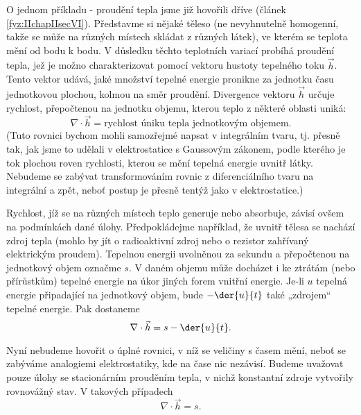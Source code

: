     O jednom příkladu - proudění tepla jsme již hovořili dříve (článek \ref{fyz:IIchapIIsecVI}).
    Představme si nějaké těleso (ne nevyhnutelně homogenní, takže se může na různých místech skládat
    z různých látek), ve kterém se teplota mění od bodu k bodu. V důsledku těchto teplotních variací
    probíhá proudění tepla, jež je možno charakterizovat pomocí vektoru hustoty tepelného toku
    \(\vec{h}\). Tento vektor udává, jaké množství tepelné energie pronikne za jednotku času
    jednotkovou plochou, kolmou na směr proudění. Divergence vektoru \(\vec{h}\) určuje rychlost,
    přepočtenou na jednotku objemu, kterou teplo z některé oblasti uniká:
    \begin{equation*}
      \nabla\cdot\vec{h} = \text{rychlost úniku tepla jednotkovým objemem.}
    \end{equation*}
    (Tuto rovnici bychom mohli samozřejmé napsat v integrálním tvaru, tj. přesně tak, jak jsme to
    udělali v elektrostatice s Gaussovým zákonem, podle kterého je tok plochou roven rychlosti,
    kterou se mění tepelná energie uvnitř látky. Nebudeme se zabývat transformováním rovnic z
    diferenciálního tvaru na integrální a zpět, neboť postup je přesně tentýž jako v
    elektrostatice.)

    Rychlost, jíž se na různých místech teplo generuje nebo absorbuje, závisí ovšem na podmínkách
    dané úlohy. Předpokládejme například, že uvnitř tělesa se nachází zdroj tepla (mohlo by jít o
    radioaktivní zdroj nebo o rezistor zahřívaný elektrickým proudem). Tepelnou energii uvolněnou za
    sekundu a přepočtenou na jednotkový objem označme \(s\). V daném objemu může docházet i ke
    ztrátám (nebo přírůstkům) tepelné energie na úkor jiných forem vnitřní energie. Je-li \(u\)
    tepelná energie připadající na jednotkový objem, bude \(-\der{u}{t}\) také „zdrojem“ tepelné
    energie. Pak dostaneme
    \begin{equation}\label{fyz:eq760}
      \nabla\cdot\vec{h} = s - \der{u}{t}.
    \end{equation}

    Nyní nebudeme hovořit o úplné rovnici, v níž se veličiny s časem mění, neboť se zabýváme 
    analogiemi elektrostatiky, kde na čase nic nezávisí. Budeme uvažovat pouze úlohy se stacionárním
    prouděním tepla, v nichž konstantní zdroje vytvořily rovnovážný stav. V takových případech
    \begin{equation}\label{fyz:eq761}
      \nabla\cdot\vec{h} = s.
    \end{equation}

